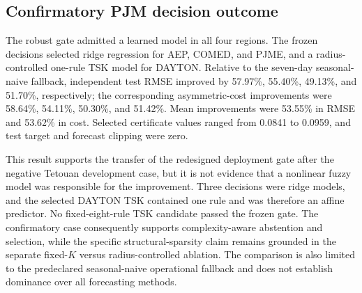 \subsection{Confirmatory PJM decision outcome}
The robust gate admitted a learned model in all four regions. The frozen decisions selected ridge regression for AEP, COMED, and PJME, and a radius-controlled one-rule TSK model for DAYTON. Relative to the seven-day seasonal-naive fallback, independent test RMSE improved by 57.97\%, 55.40\%, 49.13\%, and 51.70\%, respectively; the corresponding asymmetric-cost improvements were 58.64\%, 54.11\%, 50.30\%, and 51.42\%. Mean improvements were 53.55\% in RMSE and 53.62\% in cost. Selected certificate values ranged from 0.0841 to 0.0959, and test target and forecast clipping were zero.

This result supports the transfer of the redesigned deployment gate after the negative Tetouan development case, but it is not evidence that a nonlinear fuzzy model was responsible for the improvement. Three decisions were ridge models, and the selected DAYTON TSK contained one rule and was therefore an affine predictor. No fixed-eight-rule TSK candidate passed the frozen gate. The confirmatory case consequently supports complexity-aware abstention and selection, while the specific structural-sparsity claim remains grounded in the separate fixed-$K$ versus radius-controlled ablation. The comparison is also limited to the predeclared seasonal-naive operational fallback and does not establish dominance over all forecasting methods.
